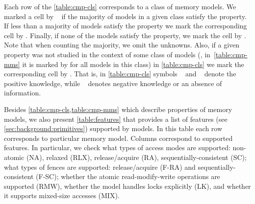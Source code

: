 Each row of the \cref{table:cmp-cls} corresponds to a class of memory models.
We marked a cell by \cmark~ if the majority of models in a given class satisfy the property. 
If less than a majority of models satisfy the property we mark 
the corresponding cell by \wmark.
Finally, if none of the models satisfy the property, we mark the cell by \xmark. 
Note that when counting the majority, we omit the unknowns.
Also, if a given property was not studied in the context of some class of models 
(\ie, in~\cref{table:cmp-mms} it is marked by \qmark for all models in this class)
in \cref{table:cmp-cls} we mark the corresponding cell by \xmark. 
That is, in \cref{table:cmp-cls} symbols \cmark~ and \wmark~ denote the positive knowledge,
while \xmark~ denotes negative knowledge or an absence of information.

Besides \cref{table:cmp-cls,table:cmp-mms} which describe 
properties of memory models, we also present \cref{table:features}
that provides a list of features (see \cref{sec:background:primitives}) 
supported by models.
In this table each row corresponds to particular memory model. 
Columns correspond to supported features. 
In particular, we check what types of access modes are supported:
non-atomic (NA), relaxed (RLX), release/acquire (RA), sequentially-consistent (SC); 
what types of fences are supported: release/acquire (F-RA) and sequentially-consistent (F-SC);
whether the atomic read-modify-write operations are supported (RMW),
whether the model handles locks explicitly (LK),
and whether it supports mixed-size accesses (MIX).

